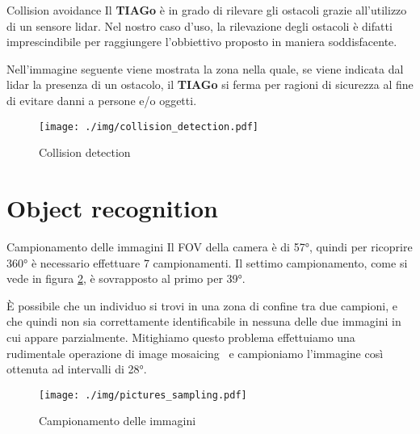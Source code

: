\documentclass[10pt]{beamer}
\begin{document}
	\begin{frame}{Collision avoidance}
		Il \textbf{TIAGo} è in grado di rilevare gli ostacoli grazie
		all'utilizzo di un sensore lidar. Nel nostro caso d'uso, la rilevazione
		degli ostacoli è difatti imprescindibile per raggiungere l'obbiettivo
		proposto in maniera soddisfacente. 
		
		Nell'immagine seguente viene mostrata la zona nella quale, se viene
		indicata dal lidar la presenza di un ostacolo, il \textbf{TIAGo} si
		ferma per ragioni di sicurezza al fine di evitare danni a persone e/o
		oggetti.
		\begin{figure}[H]
			\centering
			\texttt{[image: ./img/collision\_detection.pdf]}
			\caption{Collision detection}
			\label{fig:collision_detection}
		\end{figure}
	\end{frame}
	
	\section{Object recognition}\label{sec:Object-recognition}
	\frame{\sectionpage}
	
	\begin{frame}{Campionamento delle immagini}
		Il FOV della camera è di 57°, quindi per ricoprire 360° è necessario
		effettuare 7 campionamenti. Il settimo campionamento, come si vede in
		figura \ref{fig:campionamento_immagini}, è sovrapposto al primo per 39°.

		È possibile che un individuo si trovi in una zona di confine
		tra due campioni, e che quindi non sia correttamente identificabile in
		nessuna delle due immagini in cui appare parzialmente. Mitighiamo
		questo problema effettuiamo una rudimentale operazione di image
		mosaicing~\cite{ghosh2016survey} e campioniamo l'immagine così
		ottenuta ad intervalli di 28°.
		
		
		\begin{figure}[H]
			\centering
			\texttt{[image: ./img/pictures\_sampling.pdf]}
			\caption{Campionamento delle immagini}
			\label{fig:campionamento_immagini}
		\end{figure}
	\end{frame}
	
\end{document}
